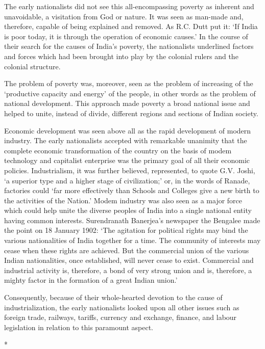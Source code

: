 The early nationalists did not see this all-encompassing poverty as inherent and unavoidable, a visitation from God or nature. It was seen as man-made and, therefore, capable of being explained and removed. As R.C. Dutt put it: `If India is poor today, it is through the operation of economic causes.' In the course of their search for the causes of India's poverty, the nationalists underlined factors and forces which had been brought into play by the colonial rulers and the colonial structure.

The problem of poverty was, moreover, seen as the problem of increasing of the `productive capacity and energy' of the people, in other words as the problem of national development. This approach made poverty a broad national issue and helped to unite, instead of divide, different regions and sections of Indian society.

Economic development was seen above all as the rapid development of modern industry. The early nationalists accepted with remarkable unanimity that the complete economic transformation of the country on the basis of modem technology and capitalist enterprise was the primary goal of all their economic policies. Industrialism, it was further believed, represented, to quote G.V. Joshi, `a superior type and a higher stage of civilization;' or, in the words of Ranade, factories could `far more effectively than Schools and Colleges give a new birth to the activities of the Nation.' Modem industry was also seen as a major force which could help unite the diverse peoples of India into a single national entity having common interests. Surendranath Banerjea's newspaper the Bengalee made the point on 18 January 1902: `The agitation for political rights may bind the various nationalities of India together for a time. The community of interests may cease when these rights are achieved. But the commercial union of the various Indian nationalities, once established, will never cease to exist. Commercial and industrial activity is, therefore, a bond of very strong union and is, therefore, a mighty factor in the formation of a great Indian union.'

Consequently, because of their whole-hearted devotion to the cause of industrialization, the early nationalists looked upon all other issues such as foreign trade, railways, tariffs, currency and exchange, finance, and labour legislation in relation to this paramount aspect.

\begin{center}*\end{center}

